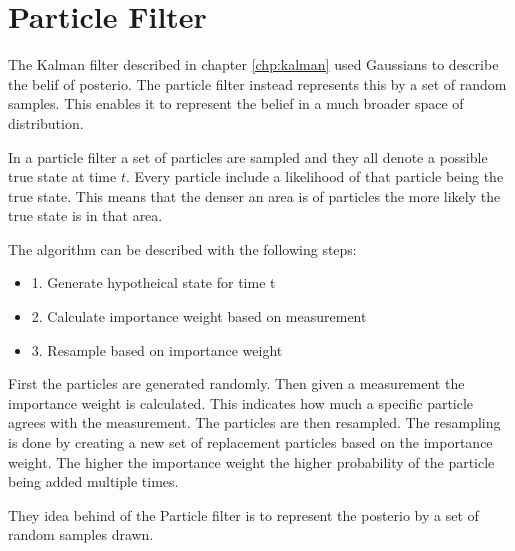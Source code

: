 \chapter{Particle Filter}
\label{chp:partFilter}

The Kalman filter described in chapter \ref{chp:kalman} used Gaussians to describe the belif of posterio. The particle filter instead represents this by a set of random samples. This enables it to represent the belief in a much broader space of distribution.

In a particle filter a set of particles are sampled and they all denote a possible true state at time $t$. Every particle include a likelihood of that particle being the true state. This means that the denser an area is of particles the more likely the true state is in that area.

The algorithm can be described with the following steps:
\begin{itemize}
	\item 1. Generate hypotheical state for time t 
	\item 2. Calculate importance weight based on measurement
	\item 3. Resample based on importance weight
\end{itemize}

First the particles are generated randomly. Then given a measurement the importance weight is calculated. This indicates how much a specific particle agrees with the measurement. The particles are then resampled. The resampling is done by creating a new set of replacement particles based on the importance weight. The higher the importance weight the higher probability of the particle being added multiple times.

They idea behind of the Particle filter is to represent the posterio by a set of random samples drawn.